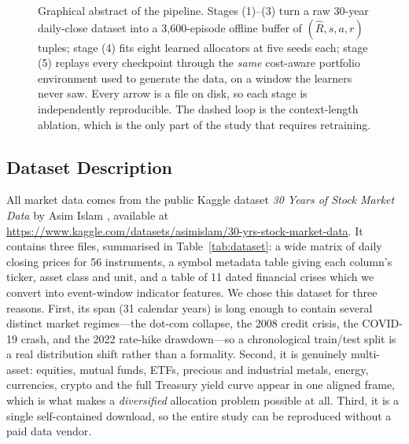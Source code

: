 \documentclass[11pt]{article}
\begin{document}
\begin{figure}[t]
\caption{Graphical abstract of the pipeline. Stages (1)--(3) turn a raw 30-year
daily-close dataset into a 3{,}600-episode offline buffer of $(\hat{R},s,a,r)$ tuples;
stage (4) fits eight learned allocators at five seeds each; stage (5) replays every
checkpoint through the \emph{same} cost-aware portfolio environment used to generate the
data, on a window the learners never saw. Every arrow is a file on disk, so each stage is
independently reproducible. The dashed loop is the context-length ablation, which is the only
part of the study that requires retraining.}
\label{fig:block}
\end{figure}

\subsection{Dataset Description}
\label{sec:data}

All market data comes from the public Kaggle dataset \emph{30 Years of Stock Market Data}
by Asim Islam \cite{islam2025dataset}, available at
\url{https://www.kaggle.com/datasets/asimislam/30-yrs-stock-market-data}. It contains three
files, summarised in Table~\ref{tab:dataset}: a wide matrix of daily closing prices for 56
instruments, a symbol metadata table giving each column's ticker, asset class and unit, and a
table of 11 dated financial crises which we convert into event-window indicator features. We
chose this dataset for three reasons. First, its span (31 calendar years) is long enough to
contain several distinct market regimes---the dot-com collapse, the 2008 credit crisis, the
COVID-19 crash, and the 2022 rate-hike drawdown---so a chronological train/test split is a
real distribution shift rather than a formality. Second, it is genuinely multi-asset: equities,
mutual funds, ETFs, precious and industrial metals, energy, currencies, crypto and the full
Treasury yield curve appear in one aligned frame, which is what makes a \emph{diversified}
allocation problem possible at all. Third, it is a single self-contained download, so the
entire study can be reproduced without a paid data vendor.
\end{document}
